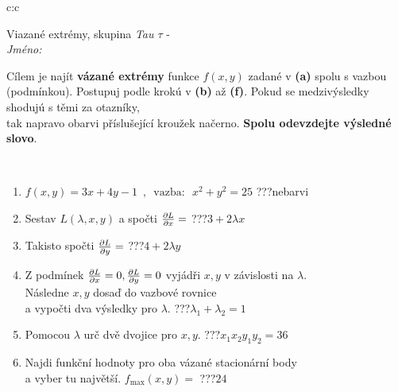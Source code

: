 \documentclass[10pt]{report}
\begin{document}
\begin{tabular}{c:c}
\begin{minipage}[c][104.5mm][t]{0.5\linewidth}
\begin{center}
\vspace{7mm}
{\huge Viazané extrémy, skupina \textit{Tau $\tau$} -}\\[5mm]
\textit{Jméno:}\phantom{xxxxxxxxxxxxxxxxxxxxxxxxxxxxxxxxxxxxxxxxxxxxxxxxxxxxxxxxxxxxxxxxx}\\[5mm]
\begin{minipage}{0.95\linewidth}
\begin{center}
Cílem je najít \textbf{vázané extrémy} funkce $f(x,y)$ zadané v \textbf{(a)} spolu s vazbou (podmínkou). Postupuj podle krokú v \textbf{(b)} až \textbf{(f)}. Pokud se medzivýsledky shodujú s těmi za otazníky,\\tak napravo obarvi příslušející kroužek načerno. \textbf{Spolu odevzdejte výsledné slovo}.
\end{center}
\end{minipage}
\\[1mm]
\begin{minipage}{0.79\linewidth}
\begin{center}
\begin{varwidth}{\linewidth}
\begin{enumerate}
\normalsize
\item $f(x,y)=3x+4y-1 \enspace , \enspace \mathrm{vazba:} \enspace x^2+y^2=25$\quad \dotfill\; ???\;\dotfill \quad nebarvi
\item Sestav $L(\lambda,x,y)$ a spočti $\pdv{L}{x}=$\quad \dotfill\; ???\;\dotfill \quad $3+2\lambda x$
\item Takisto spočti $\pdv{L}{y}=$\quad \dotfill\; ???\;\dotfill \quad $4+2\lambda y$
\item Z podmínek $\pdv{L}{x}=0 , \pdv{L}{y}=0$ vyjádři $x,y$ v závislosti na $\lambda$.\\ \phantom{xxxxxx}Následne $x,y$ dosaď do vazbové rovnice\\ \phantom{xxxxxx}a vypočti dva výsledky pro $\lambda$.\quad \dotfill\; ???\;\dotfill \quad $\lambda_1+\lambda_2=1$
\item Pomocou $\lambda$ urč dvě dvojice pro $x,y$.\quad \dotfill\; ???\;\dotfill \quad $x_1 x_2 y_1 y_2=36$
\item Najdi funkční hodnoty pro oba vázané stacionární body\\ \phantom{xxxxxx}a vyber tu najvětší. $f_{\text{max}}(x,y)=$\quad \dotfill\; ???\;\dotfill \quad $24$

\end{enumerate}
\end{varwidth}
\end{center}
\end{minipage}
\end{center}
\end{minipage}
\end{tabular}
\end{document}

